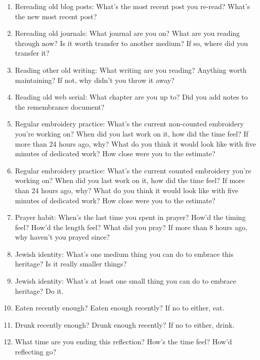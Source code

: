 \documentclass[12pt]{article}
\renewcommand{\,}{\textsuperscript{,}}
\begin{document}
\begin{enumerate}
\item Rereading old blog posts: What's the most recent post you re-read? What's the new most recent post?

\item Rereading old journals: What journal are you on? What are you reading through now? Is it worth transfer to another medium? If so, where did you transfer it?

\item Reading other old writing: What writing are you reading? Anything worth maintaining? If not, why didn't you throw it away?

\item Reading old web serial: What chapter are you up to? Did you add notes to the remembrance document?

\item Regular embroidery practice: What's the current non-counted embroidery you're working on? When did you last work on it, how did the time feel? If more than 24 hours ago, why? What do you think it would look like with five minutes of dedicated work? How close were you to the estimate?

\item Regular embroidery practice: What's the current counted embroidery you're working on? When did you last work on it, how did the time feel? If more than 24 hours ago, why? What do you think it would look like with five minutes of dedicated work? How close were you to the estimate?

\item Prayer habit: When's the last time you spent in prayer? How'd the timing feel? How'd the length feel? What did you pray? If more than 8 hours ago, why haven't you prayed since?

\item Jewish identity: What's one medium thing you can do to embrace this heritage? Is it really smaller things?

\item Jewish identity: What's at least one small thing you can do to embrace heritage? Do it.

\item Eaten recently enough? Eaten enough recently? If no to either, eat.

\item Drunk recently enough? Drunk enough recently? If no to either, drink.

\item What time are you ending this reflection? How's the time feel? How'd reflecting go?

\end{enumerate}
\end{document}
